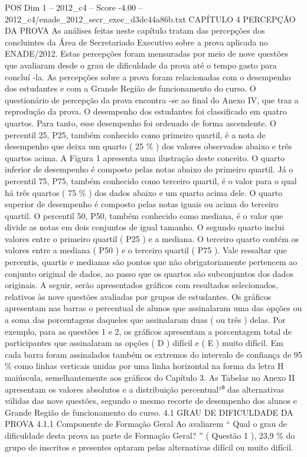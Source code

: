\begin{textsample}{POS Dim 1 – 2012\_c4 – Score -4.00 – 2012\_c4/enade\_2012\_secr\_exec\_d3dc44a86b.txt}  \label{ex:f1_pos_362}
CAPÍTULO 4 PERCEPÇÃO DA PROVA As análises feitas neste capítulo tratam das percepções dos concluintes da Área de Secretariado Executivo sobre a prova aplicada no ENADE/2012.
Estas percepções foram mensuradas por meio de nove questões que avaliaram desde o grau de dificuldade da prova até o tempo gasto para concluí -la.
As percepções sobre a prova foram relacionadas com o desempenho dos estudantes e com a Grande Região de funcionamento do curso.
O questionário de percepção da prova encontra -se ao final do Anexo IV, que traz a reprodução da prova.
O desempenho dos estudantes foi classificado em quatro quartos.
Para tanto, esse desempenho foi ordenado de forma ascendente.
O percentil 25, P25, também conhecido como primeiro quartil, é a nota de desempenho que deixa um quarto ( 25 \% ) dos valores observados abaixo e três quartos acima.
A Figura 1 apresenta uma ilustração deste conceito.
O quarto inferior de desempenho é composto pelas notas abaixo do primeiro quartil.
Já o percentil 75, P75, também conhecido como terceiro quartil, é o valor para o qual há três quartos ( 75 \% ) dos dados abaixo e um quarto acima dele.
O quarto superior de desempenho é composto pelas notas iguais ou acima do terceiro quartil.
O percentil 50, P50, também conhecido como mediana, é o valor que divide as notas em dois conjuntos de igual tamanho.
O segundo quarto inclui valores entre o primeiro quartil ( P25 ) e a mediana.
O terceiro quarto contém os valores entre a mediana ( P50 ) e o terceiro quartil ( P75 ).
Vale ressaltar que percentis, quartis e medianas são pontos que não obrigatoriamente pertencem ao conjunto original de dados, ao passo que os quartos são subconjuntos dos dados originais.
A seguir, serão apresentados gráficos com resultados selecionados, relativos às nove questões avaliadas por grupos de estudantes.
Os gráficos apresentam nas barras o percentual de alunos que assinalaram uma das opções ou a soma das porcentagens daqueles que assinalaram duas ( ou três ) delas.
Por exemplo, para as questões 1 e 2, os gráficos apresentam a porcentagem total de participantes que assinalaram as opções ( D ) difícil e ( E ) muito difícil.
Em cada barra foram assinalados também os extremos do intervalo de confiança de 95 \% como linhas verticais unidas por uma linha horizontal na forma da letra H maiúscula, semelhantemente aos gráficos do Capítulo 3.
As Tabelas no Anexo II apresentam os valores absolutos e a distribuição percentual¹⁰ das alternativas válidas das nove questões, segundo o mesmo recorte de desempenho dos alunos e Grande Região de funcionamento do curso. 4.1 GRAU DE DIFICULDADE DA PROVA 4.1.1 Componente de Formação Geral Ao avaliarem “ Qual o grau de dificuldade desta prova na parte de Formação Geral? ” ( Questão 1 ), 23,9 \% do grupo de inscritos e presentes optaram pelas alternativas difícil ou muito difícil.

\end{textsample}
